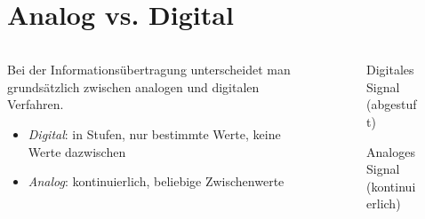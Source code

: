 
\section{Analog vs. Digital}
\label{section:analog_vs_digital}
\begin{frame}%

\begin{columns}
    \begin{column}{0.48\textwidth}
    Bei der Informationsübertragung unterscheidet man grundsätzlich zwischen analogen und digitalen Verfahren.

\begin{itemize}
  \item \emph{Digital}: in Stufen, nur bestimmte Werte, keine Werte dazwischen
  \item \emph{Analog}: kontinuierlich, beliebige Zwischenwerte
  \end{itemize}

    \end{column}
   \begin{column}{0.48\textwidth}
       
\begin{figure}
    \caption{\scriptsize Digitales Signal (abgestuft)}
    \label{n_digital_einleitung_digitales_signal}
\end{figure}


\begin{figure}
    \caption{\scriptsize Analoges Signal (kontinuierlich)}
    \label{n_digital_einleitung_analoges_signal}
\end{figure}


   \end{column}
\end{columns}

\end{frame}%
